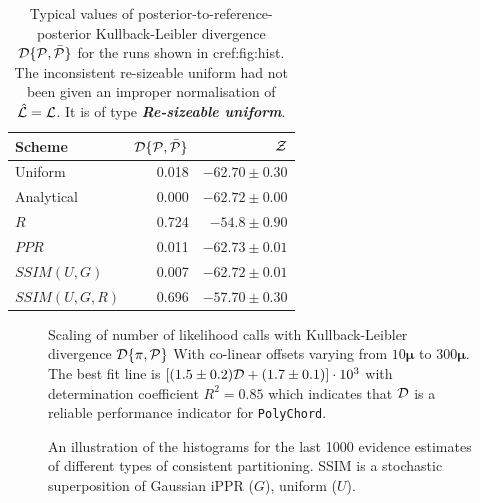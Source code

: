 \documentclass[draft,usenatbib]{mnras}
\begin{document}
\begin{table}
\centering

\caption{Typical values of posterior-to-reference-posterior
Kullback-Leibler divergence ${\cal D}\{{\cal P}, \bar{\cal P}\}$
for the runs shown in cref:fig:hist. The inconsistent
re-sizeable uniform had not been given an improper normalisation
of $\hat{\cal L} = {\cal L}$. It is of type \textbf{\emph{Re-sizeable
uniform}}.}
\begin{tabular}{lrr}
\textbf{Scheme} & ${\cal D}\{ {\cal P}, \bar{\cal P}\}$ & ${\cal Z}$\\
\hline
Uniform & 0.018 & \(-62.70 \pm 0.30\)\\
Analytical & 0.000 & \(-62.72 \pm 0.00\) \\
$R$ & 0.724 & \(-54.8 \pm 0.90\)\\
$PPR$ & 0.011 & \(-62.73 \pm 0.01\)\\
$SSIM(U, G)$ & 0.007 & \(-62.72 \pm 0.01\)\\
$SSIM(U, G, R)$ & 0.696 & \(-57.70 \pm 0.30\)\\
\end{tabular}
\label{tab:hist}
\end{table}

\begin{figure}

\caption{Scaling of number of likelihood calls with Kullback-Leibler
divergence \({\cal D}\{ \pi, {\cal P}\}\) With co-linear offsets
varying from $10\bm{\mu}$ to $300\bm{\mu}$. The best fit line is
\(\left[(1.5 \pm 0.2) {\cal D} + (1.7 \pm 0.1)\right]\cdot 10^3 \)
with determination coefficient \(R^{2} = 0.85\) which indicates
that \({\cal D}\) is a reliable performance indicator for
\texttt{PolyChord}.\label{fig:kl-scaling}}
\end{figure}

\begin{figure}

\caption{An illustration of the histograms for the last 1000 evidence
estimates of different types of consistent partitioning. SSIM is a
stochastic superposition of Gaussian iPPR (\(G\)), uniform
(\(U\)). \label{fig:hist}}
\end{figure}
\end{document}
